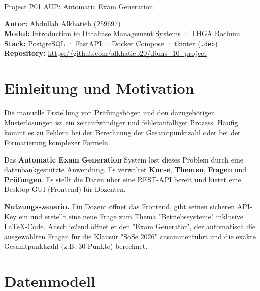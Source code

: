 \documentclass[11pt,a4paper]{article}
\begin{document}
\thispagestyle{empty}
%
{Project P01 AUP: Automatic Exam Generation}

\begin{infobox}
\textbf{Autor:} Abdullah Alkhatieb (259697) \\
\textbf{Modul:} Introduction to Database Management Systems · THGA Bochum \\
\textbf{Stack:} PostgreSQL · FastAPI · Docker Compose · tkinter (\texttt{.deb}) \\
\textbf{Repository:} \url{https://github.com/alkhatieb20/dbms_10_project}
\end{infobox}

\tableofcontents
\vspace{1em}

\section{Einleitung und Motivation}

Die manuelle Erstellung von Prüfungsbögen und den dazugehörigen Musterlösungen ist ein zeitaufwändiger und fehleranfälliger Prozess. Häufig kommt es zu Fehlern bei der Berechnung der Gesamtpunktzahl oder bei der Formatierung komplexer Formeln.

Das \textbf{Automatic Exam Generation} System löst dieses Problem durch eine datenbankgestützte Anwendung. Es verwaltet \textbf{Kurse}, \textbf{Themen}, \textbf{Fragen} und \textbf{Prüfungen}. Es stellt die Daten über eine REST-API bereit und bietet eine Desktop-GUI (Frontend) für Dozenten.

\begin{beispielbox}
\textbf{Nutzungsszenario.} Ein Dozent öffnet das Frontend, gibt seinen sicheren API-Key ein und erstellt eine neue Frage zum Thema "Betriebssysteme" inklusive LaTeX-Code. Anschließend öffnet er den "Exam Generator", der automatisch die ausgewählten Fragen für die Klausur "SoSe 2026" zusammenführt und die exakte Gesamtpunktzahl (z.B. 30 Punkte) berechnet.
\end{beispielbox}

\section{Datenmodell}
\end{document}
